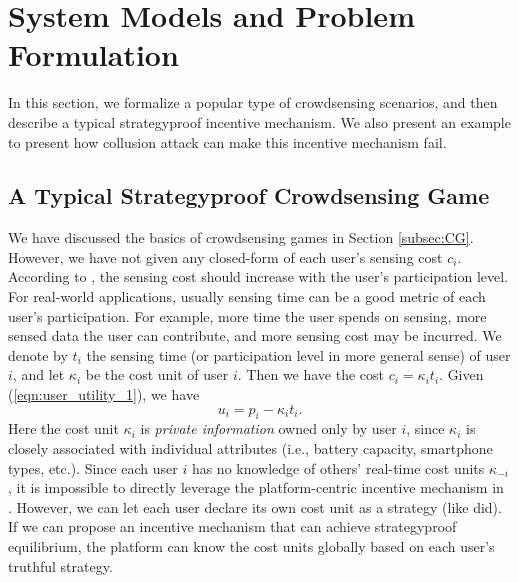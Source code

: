 \documentclass[conference]{IEEEtran}
\theoremstyle{definition}
\begin{document}
{\color{black}
\section{System Models and Problem Formulation}
\label{sec:PFSM}
{\color{black}
In this section, we formalize a popular type of crowdsensing scenarios, and then describe a typical strategyproof incentive mechanism. We also present an example to present how collusion attack can make this incentive mechanism fail. %
}

\subsection{\color{black} A Typical Strategyproof Crowdsensing Game}
We have discussed the basics of crowdsensing games in Section \ref{subsec:CG}. However, we have not given any closed-form of each user\rq{}s sensing cost $c_i$. According to \cite{koutsopoulos2013optimal}, the sensing cost should increase with the user\rq{}s participation level. For real-world applications, usually sensing time can be a good metric of each user's participation. For example, more time the user spends on sensing, more sensed data the user can contribute, and more sensing cost may be incurred. We denote by $t_i$ the sensing time (or participation level in more general sense) of user $i$, and let $\kappa_i$ be the cost unit of user $i$. Then we have the cost $c_i=\kappa_it_i$. Given (\ref{eqn:user_utility_1}), we have
\begin{equation}
\label{eqn:user_utility_2}
u_i = p_i-\kappa_it_i.
\end{equation}
Here the cost unit $\kappa_i$ is \emph{private information} owned only by user $i$, since $\kappa_i$ is closely associated with individual attributes (i.e., battery capacity, smartphone types, etc.). Since each user $i$ has no knowledge of others\rq{} real-time cost units $\kappa_{-i}$, it is impossible to directly leverage the platform-centric incentive mechanism in \cite{yang2012crowdsourcing}. However, we can let each user declare its own cost unit as a strategy (like \cite{zhong2007designing} did). If we can propose an incentive mechanism that can achieve strategyproof equilibrium, the platform can know the cost units globally based on each user\rq{}s truthful strategy.

}
\end{document}
